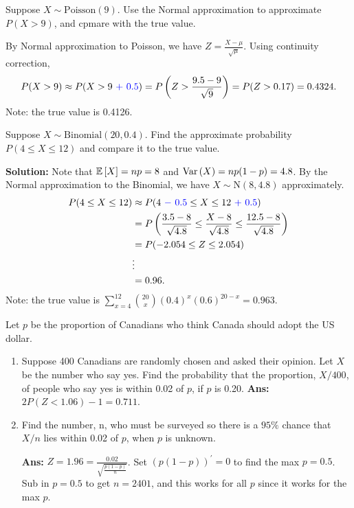 \begin{example}
    Suppose $X \sim \text{Poisson}(9)$. Use the Normal approximation to approximate $P(X > 9)$, and cpmare with the true value.

    By Normal approximation to Poisson, we have $Z = \frac{X-\mu}{\sqrt{\mu}}$. Using continuity correction, \vspace{-3mm}
    \[
        P(X > 9) \approx P(X > 9 \text{ } {\color{blue} + \text{ } 0.5}) = P \left( Z > \frac{9.5 - 9}{\sqrt{9}} \right) = P(Z > 0.17) = 0.4324.
    \]
    Note: the true value is 0.4126.
\end{example}

\begin{example}
    Suppose $X \sim \text{Binomial}(20,0.4)$. Find the approximate probability $P(4 \leq X \leq 12)$ and compare it to the true value.

    \textbf{Solution:} Note that $\mathbb{E}\left[{X}\right] = np = 8$ and $\operatorname{Var}\left({X}\right) = np(1-p) = 4.8$. By the Normal approximation to the Binomial, we have $X \sim \text{N}(8,4.8)$ approximately.
    \begin{align*}
        P(4 \leq X \leq 12) &\approx P(4 \text{ } {\color{blue} - \text{ } 0.5} \leq X \leq 12 \text{ } {\color{blue} + \text{ } 0.5}) \\
        &= P \left( \frac{3.5 - 8}{\sqrt{4.8}} \leq \frac{X - 8}{\sqrt{4.8}} \leq \frac{12.5 - 8}{\sqrt{4.8}} \right) \\
        &= P(-2.054 \leq Z \leq 2.054) \\
        &\vdots \\
        &= 0.96.
    \end{align*}
    Note: the true value is $\displaystyle \sum_{x=4}^{12} \binom{20}{x} (0.4)^x (0.6)^{20-x} = 0.963$. \\
\end{example}

\begin{example}
    Let $p$ be the proportion of Canadians who think Canada should adopt the US dollar.
    \begin{enumerate}[label=(\alph*)]
        \item Suppose 400 Canadians are randomly chosen and asked their opinion. Let $X$ be the number who say yes. Find the probability that the proportion, $X/400$, of people who say yes is within 0.02 of $p$, if $p$ is 0.20.
        \quad \textbf{Ans:} $2P(Z < 1.06) - 1 = 0.711$.
        \item Find the number, n, who must be surveyed so there is a $95\%$ chance that $X/n$ lies within 0.02 of $p$, when $p$ is unknown.
        
        \textbf{Ans:} $Z = 1.96 = \frac{0.02}{\sqrt{\frac{p(1-p)}{n}}}$. Set $(p(1-p))^\prime = 0$ to find the max $p = 0.5$. Sub in $p = 0.5$ to get $n = 2401$, and this works for all $p$ since it works for the max $p$.
    \end{enumerate}
\end{example}

